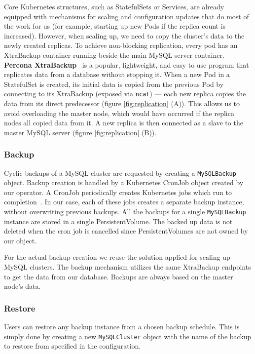 Core Kubernetes structures, such as StatefulSets or Services, are already equipped with mechanisms
for scaling and configuration updates that do most of the work for us (for example, starting up new
Pods if the replica count is increased). However, when scaling up, we need to copy the cluster’s
data to the newly created replicas. To achieve non-blocking replication, every pod has an XtraBackup
container running beside the main MySQL server container. \textbf{Percona XtraBackup}~\cite{percona}
is a popular, lightweight, and easy to use program that replicates data from a database without
stopping it. When a new Pod in a StatefulSet is created, its initial data is copied from the
previous Pod by connecting to its XtraBackup (exposed via \texttt{ncat}) --- each new replica copies
the data from its direct predecessor (figure \ref{fig:replication} (A)). This allows us to avoid overloading
the master node, which would have occurred if the replica nodes all copied data from it. A new
replica is then connected as a slave to the master MySQL server (figure \ref{fig:replication} (B)).

\subsubsection*{Backup}
Cyclic backups of a MySQL cluster are requested by creating a \texttt{MySQLBackup} object. Backup creation is
handled by a Kubernetes CronJob object created by our operator. A CronJob periodically creates
Kubernetes jobs which run to completion~\cite{kube-comp}. In our case, each of these jobs creates a
separate backup instance, without overwriting previous backups. All the backups for a single
\texttt{MySQLBackup} instance are stored in a single PersistentVolume. The backed up data is not deleted when
the cron job is cancelled since PersistentVolumes are not owned by our object.

For the actual backup creation we reuse the solution applied for scaling up MySQL clusters. The
backup mechanism utilizes the same XtraBackup endpoints to get the data from our database. Backups
are always based on the master node’s data.

\subsubsection*{Restore}
Users can restore any backup instance from a chosen backup schedule. This is simply done by creating
a new \texttt{MySQLCluster} object with the name of the backup to restore from specified in the
configuration.

